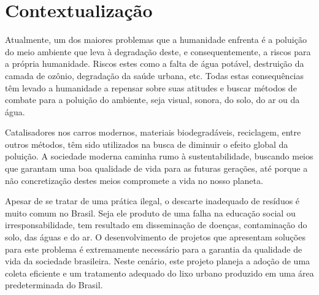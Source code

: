 \section{Contextualização}

  Atualmente, um dos maiores problemas que a humanidade enfrenta é a poluição do meio ambiente que leva à degradação deste, e consequentemente, a riscos para a própria humanidade. Riscos estes como a falta de água potável, destruição da camada de ozônio, degradação da saúde urbana, etc. Todas estas consequências têm levado a humanidade a repensar sobre suas atitudes e buscar métodos de combate para a poluição do ambiente, seja visual, sonora, do solo, do ar ou da água.
  \par
  Catalisadores nos carros modernos, materiais biodegradáveis, reciclagem, entre outros métodos, têm sido utilizados na busca de diminuir o efeito global da poluição. A sociedade moderna caminha rumo à sustentabilidade, buscando meios que garantam uma boa qualidade de vida para as futuras gerações, até porque a não concretização destes meios compromete a vida no nosso planeta.
  \par
  Apesar de se tratar de uma prática ilegal, o descarte inadequado de resíduos é muito comum no Brasil. Seja ele produto de uma falha na educação social ou irresponsabilidade, tem resultado em disseminação de doenças, contaminação do solo, das águas e do ar. O desenvolvimento de projetos que apresentam soluções para este problema é extremamente necessário para a garantia da qualidade de vida da sociedade brasileira. Neste cenário, este projeto planeja a adoção de uma coleta eficiente e um tratamento adequado do lixo urbano produzido em uma área predeterminada do Brasil.
  
